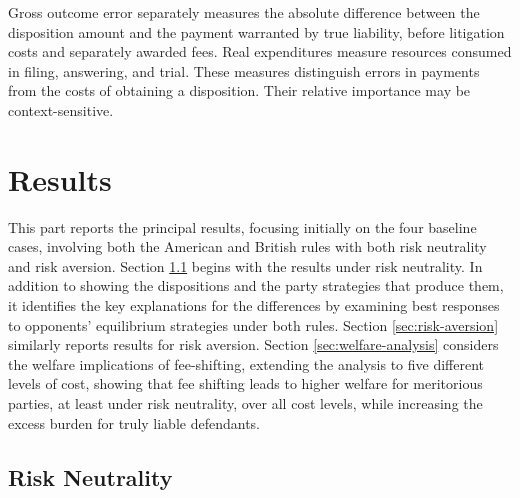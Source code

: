 \documentclass{article}
\begin{document}
Gross outcome error separately measures the absolute difference between the disposition amount and the payment warranted by true liability, before litigation costs and separately awarded fees. Real expenditures measure resources consumed in filing, answering, and trial. These measures distinguish errors in payments from the costs of obtaining a disposition. Their relative importance may be context-sensitive. 

\section{Results}
\label{sec:results}

This part reports the principal results, focusing initially on the four baseline cases, involving both the American and British rules with both risk neutrality and risk aversion. Section \ref{sec:risk-neutrality} begins with the results under risk neutrality. In addition to showing the dispositions and the party strategies that produce them, it identifies the key explanations for the differences by examining best responses to opponents' equilibrium strategies under both rules. Section \ref{sec:risk-aversion} similarly reports results for risk aversion. Section \ref{sec:welfare-analysis} considers the welfare implications of fee-shifting, extending the analysis to five different levels of cost, showing that fee shifting leads to higher welfare for meritorious parties, at least under risk neutrality, over all cost levels, while increasing the excess burden for truly liable defendants.

\subsection{Risk Neutrality}
\label{sec:risk-neutrality}
\end{document}
